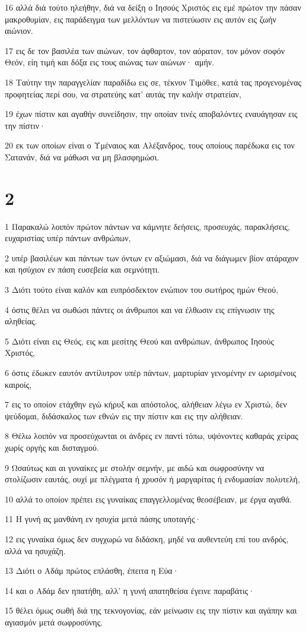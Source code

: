 \par 16 αλλά διά τούτο ηλεήθην, διά να δείξη ο Ιησούς Χριστός εις εμέ πρώτον την πάσαν μακροθυμίαν, εις παράδειγμα των μελλόντων να πιστεύωσιν εις αυτόν εις ζωήν αιώνιον.
\par 17 εις δε τον βασιλέα των αιώνων, τον άφθαρτον, τον αόρατον, τον μόνον σοφόν Θεόν, είη τιμή και δόξα εις τους αιώνας των αιώνων· αμήν.
\par 18 Ταύτην την παραγγελίαν παραδίδω εις σε, τέκνον Τιμόθεε, κατά τας προγενομένας προφητείας περί σου, να στρατεύης κατ' αυτάς την καλήν στρατείαν,
\par 19 έχων πίστιν και αγαθήν συνείδησιν, την οποίαν τινές αποβαλόντες εναυάγησαν εις την πίστιν·
\par 20 εκ των οποίων είναι ο Υμέναιος και Αλέξανδρος, τους οποίους παρέδωκα εις τον Σατανάν, διά να μάθωσι να μη βλασφημώσι.

\chapter{2}

\par 1 Παρακαλώ λοιπόν πρώτον πάντων να κάμνητε δεήσεις, προσευχάς, παρακλήσεις, ευχαριστίας υπέρ πάντων ανθρώπων,
\par 2 υπέρ βασιλέων και πάντων των όντων εν αξιώμασι, διά να διάγωμεν βίον ατάραχον και ησύχιον εν πάση ευσεβεία και σεμνότητι.
\par 3 Διότι τούτο είναι καλόν και ευπρόσδεκτον ενώπιον του σωτήρος ημών Θεού,
\par 4 όστις θέλει να σωθώσι πάντες οι άνθρωποι και να έλθωσιν εις επίγνωσιν της αληθείας.
\par 5 Διότι είναι εις Θεός, εις και μεσίτης Θεού και ανθρώπων, άνθρωπος Ιησούς Χριστός,
\par 6 όστις έδωκεν εαυτόν αντίλυτρον υπέρ πάντων, μαρτυρίαν γενομένην εν ωρισμένοις καιροίς,
\par 7 εις το οποίον ετάχθην εγώ κήρυξ και απόστολος, αλήθειαν λέγω εν Χριστώ, δεν ψεύδομαι, διδάσκαλος των εθνών εις την πίστιν και εις την αλήθειαν.
\par 8 Θέλω λοιπόν να προσεύχωνται οι άνδρες εν παντί τόπω, υψόνοντες καθαράς χείρας χωρίς οργής και δισταγμού.
\par 9 Ωσαύτως και αι γυναίκες με στολήν σεμνήν, με αιδώ και σωφροσύνην να στολίζωσιν εαυτάς, ουχί με πλέγματα ή χρυσόν ή μαργαρίτας ή ενδυμασίαν πολυτελή,
\par 10 αλλά το οποίον πρέπει εις γυναίκας επαγγελλομένας θεοσέβειαν, με έργα αγαθά.
\par 11 Η γυνή ας μανθάνη εν ησυχία μετά πάσης υποταγής·
\par 12 εις γυναίκα όμως δεν συγχωρώ να διδάσκη, μηδέ να αυθεντεύη επί του ανδρός, αλλά να ησυχάζη.
\par 13 Διότι ο Αδάμ πρώτος επλάσθη, έπειτα η Εύα·
\par 14 και ο Αδάμ δεν ηπατήθη, αλλ' η γυνή απατηθείσα έγεινε παραβάτις·
\par 15 θέλει όμως σωθή διά της τεκνογονίας, εάν μείνωσιν εις την πίστιν και αγάπην και αγιασμόν μετά σωφροσύνης.

